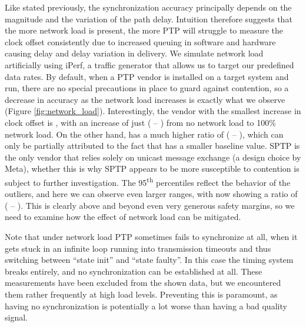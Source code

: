 Like stated previously, the synchronization accuracy principally depends on the magnitude and the variation of the path delay. Intuition therefore suggests that the more network load is present, the more PTP will struggle to measure the clock offset consistently due to increased queuing in software and hardware causing delay and delay variation in delivery. We simulate network load artificially using iPerf, a traffic generator that allows us to target our predefined data rates. By default, when a PTP vendor is installed on a target system and run, there are no special precautions in place to guard against contention, so a decrease in accuracy as the network load increases is exactly what we observe (Figure \ref{fig:network_load}). Interestingly, the vendor with the smallest increase in clock offset is \fVendor{\cmpMinArg}, with an increase of just \fRatio[1]{\cmpMin} ( -- ) from no network load to 100\% network load. On the other hand, \fVendor{\cmpMaxArg} has a much higher ratio of \fRatio{\cmpMax} ( -- ), which can only be partially attributed to the fact that \fVendor{\cmpMaxArg} has a smaller baseline value.
%
SPTP is the only vendor that relies solely on unicast message exchange (a design choice by Meta), whether this is why SPTP appears to be more susceptible to contention is subject to further investigation.%
%
%
The 95\textsuperscript{th} percentiles reflect the behavior of the outliers, and here we can observe even larger ranges, with \fVendor{\cmpMaxArg} now showing a ratio of \fRatio[-1]{\cmpMax} ( -- ). This is clearly above and beyond even very generous safety margins, so we need to examine how the effect of network load can be mitigated.

 Note that under network load PTP sometimes fails to synchronize at all, when it gets stuck in an infinite loop running into transmission timeouts and thus switching between ``state init'' and ``state faulty''. In this case the timing system breaks entirely, and no synchronization can be established at all. These measurements have been excluded from the shown data, but we encountered them rather frequently at high load levels. Preventing this is paramount, as having no synchronization is potentially a lot worse than having a bad quality signal.

